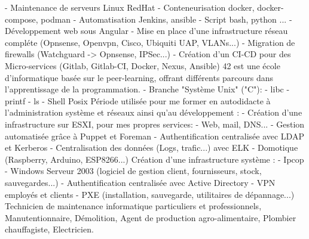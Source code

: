 \documentclass[
	a4paper,
]{FortySecondsCV/fortysecondscv}
\begin{document}
\makefrontsidebar
{}
\begin{cvtable}[3]
 	{
  		\tabto{2mm}- Maintenance de serveurs Linux RedHat
    		\tabto{2mm}- Conteneurisation docker, docker-compose, podman
      		\tabto{2mm}- Automatisation Jenkins, ansible
		\tabto{2mm}- Script bash, python
	}
 	{...} 
		{
			\tabto{2mm}- Développement web sous Angular
			\tabto{2mm}- Mise en place  d'une infrastructure réseau compléte (Opnsense, Openvpn, Cisco, Ubiquiti UAP, VLANs...)
			\tabto{2mm}- Migration de firewalls (Watchguard -> Opnsense, IPSec...)
			\tabto{2mm}- Création d'un CI-CD pour des Micro-services (Gitlab, Gitlab-CI, Docker, Nexus, Ansible)
		}
	{
	42 est une école d'informatique basée sur le peer-learning, offrant différents parcours dans l'apprentissage de la programmation.
		\tabto{2mm}- Branche "Système Unix" ("C"):
   			\tabto{4mm}- libc
      			\tabto{4mm}- printf
	 		\tabto{4mm}- ls
    			\tabto{4mm}- Shell Posix
	}
	{
		Période utilisée pour me former en autodidacte à l'administration système et réseaux ainsi qu'au développement :
		\tabto{2mm}- Création d'une infrastructure sur ESXI, pour mes propres services:
			\tabto{4mm}- Web, mail, DNS...
			\tabto{4mm}- Gestion automatisée grâce à Puppet et Foreman
			\tabto{4mm}- Authentification centralisée avec LDAP et Kerberos
			\tabto{4mm}- Centralisation des données (Logs, trafic...) avec ELK
		\tabto{2mm}- Domotique (Raspberry, Arduino, ESP8266...)
	}
	{
		Création d'une infrastructure système :
			\tabto{2mm}- Ipcop
			\tabto{2mm}- Windows Serveur 2003 (logiciel de gestion client, fournisseurs, stock, sauvegardes...)
			\tabto{2mm}- Authentification centralisée avec Active Directory
			\tabto{2mm}- VPN employés et clients
			\tabto{2mm}- PXE (installation, sauvegarde, utilitaires de dépannage...)
	}
	{
		Technicien de maintenance informatique particuliers et professionnels, Manutentionnaire, Démolition, Agent de production agro-alimentaire, Plombier chauffagiste, Electricien.
	}
	{ }
\end{cvtable}
\end{document}
